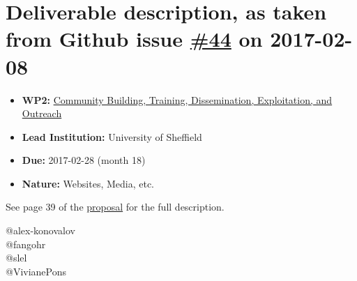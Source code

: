 \section*{\texorpdfstring{Deliverable description, as taken from Github
issue
\href{https://github.com/OpenDreamKit/OpenDreamKit/issues/44}{\#44} on
2017-02-08}{Deliverable description, as taken from Github issue \#44 on 2017-02-08}}\label{deliverable-description-as-taken-from-github-issue-44-on-2017-02-08}

\begin{itemize}
\tightlist
\item
  \textbf{WP2:}
  \href{https://github.com/OpenDreamKit/OpenDreamKit/tree/master/WP2}{Community
  Building, Training, Dissemination, Exploitation, and Outreach}
\item
  \textbf{Lead Institution:} University of Sheffield
\item
  \textbf{Due:} 2017-02-28 (month 18)
\item
  \textbf{Nature:} Websites, Media, etc.
\end{itemize}

See page 39 of the
\href{https://github.com/OpenDreamKit/OpenDreamKit/raw/master/Proposal/proposal-www.pdf}{proposal}
for the full description.

@alex-konovalov\\
@fangohr\\
@slel\\
@VivianePons
